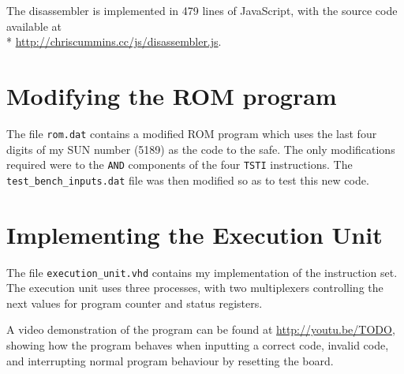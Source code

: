 \documentclass[12pt,a4paper]{article}
\begin{document}
The disassembler is implemented in 479 lines of JavaScript, with the
source code available at\\*
\url{http://chriscummins.cc/js/disassembler.js}.

\section{Modifying the ROM program}

The file \texttt{rom.dat} contains a modified ROM program which uses
the last four digits of my SUN number (5189) as the code to the
safe. The only modifications required were to the \texttt{AND}
components of the four \texttt{TSTI} instructions. The
\texttt{test\_bench\_inputs.dat} file was then modified so as to test
this new code.

\section{Implementing the Execution Unit}

The file \texttt{execution\_unit.vhd} contains my implementation of
the instruction set. The execution unit uses three processes, with two
multiplexers controlling the next values for program counter and
status registers.


A video demonstration of the program can be found at
\url{http://youtu.be/TODO}, showing how the program behaves when
inputting a correct code, invalid code, and interrupting normal
program behaviour by resetting the board.
\end{document}
